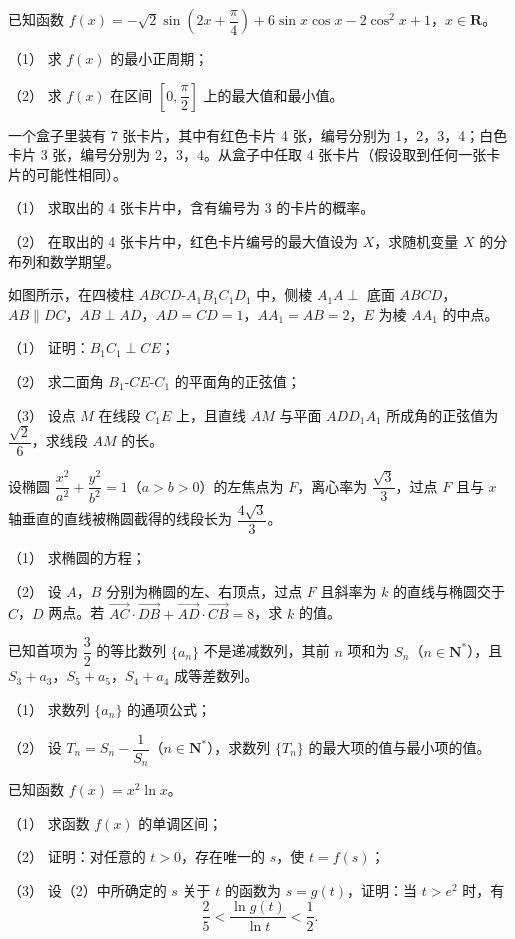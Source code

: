 \begin{question}
已知函数 $f(x)=-\sqrt2\sin\left(2x+\dfrac{\pi}{4}\right)+6\sin x\cos x-2\cos^2x+1$，$x\in\mathbf{R}$。

（1） 求 $f(x)$ 的最小正周期；

（2） 求 $f(x)$ 在区间 $\left[0,\dfrac{\pi}{2}\right]$ 上的最大值和最小值。

\end{question}
\begin{question}
一个盒子里装有 7 张卡片，其中有红色卡片 4 张，编号分别为 1，2，3，4；白色卡片 3 张，编号分别为 2，3，4。从盒子中任取 4 张卡片（假设取到任何一张卡片的可能性相同）。

（1） 求取出的 4 张卡片中，含有编号为 3 的卡片的概率。

（2） 在取出的 4 张卡片中，红色卡片编号的最大值设为 $X$，求随机变量 $X$ 的分布列和数学期望。

\Needspace{0.4\textheight}
\end{question}
\begin{question}
如图所示，在四棱柱 $ABCD\text{-}A_1B_1C_1D_1$ 中，侧棱 $A_1A\perp$ 底面 $ABCD$，$AB\parallel DC$，$AB\perp AD$，$AD=CD=1$，$AA_1=AB=2$，$E$ 为棱 $AA_1$ 的中点。

（1） 证明：$B_1C_1\perp CE$；

（2） 求二面角 $B_1\text{-}CE\text{-}C_1$ 的平面角的正弦值；

（3） 设点 $M$ 在线段 $C_1E$ 上，且直线 $AM$ 与平面 $ADD_1A_1$ 所成角的正弦值为 $\dfrac{\sqrt2}{6}$，求线段 $AM$ 的长。
\nopagebreak[4]
\begin{center}\end{center}
\nopagebreak[4]
\end{question}
\begin{question}
设椭圆 $\dfrac{x^2}{a^2}+\dfrac{y^2}{b^2}=1$（$a>b>0$）的左焦点为 $F$，离心率为 $\dfrac{\sqrt3}{3}$，过点 $F$ 且与 $x$ 轴垂直的直线被椭圆截得的线段长为 $\dfrac{4\sqrt3}{3}$。

（1） 求椭圆的方程；

（2） 设 $A$，$B$ 分别为椭圆的左、右顶点，过点 $F$ 且斜率为 $k$ 的直线与椭圆交于 $C$，$D$ 两点。若 $\overrightarrow{AC}\cdot\overrightarrow{DB}+\overrightarrow{AD}\cdot\overrightarrow{CB}=8$，求 $k$ 的值。

\end{question}
\begin{question}
已知首项为 $\dfrac32$ 的等比数列 $\{a_n\}$ 不是递减数列，其前 $n$ 项和为 $S_n$（$n\in\mathbf{N}^{*}$），且 $S_3+a_3$，$S_5+a_5$，$S_4+a_4$ 成等差数列。

（1） 求数列 $\{a_n\}$ 的通项公式；

（2） 设 $T_n=S_n-\dfrac{1}{S_n}$（$n\in\mathbf{N}^{*}$），求数列 $\{T_n\}$ 的最大项的值与最小项的值。

\end{question}
\begin{question}
已知函数 $f(x)=x^2\ln x$。

（1） 求函数 $f(x)$ 的单调区间；

（2） 证明：对任意的 $t>0$，存在唯一的 $s$，使 $t=f(s)$；

（3） 设（2）中所确定的 $s$ 关于 $t$ 的函数为 $s=g(t)$，证明：当 $t>e^2$ 时，有
\nopagebreak[4]
\[\frac25<\frac{\ln g(t)}{\ln t}<\frac12.\]

\end{question}